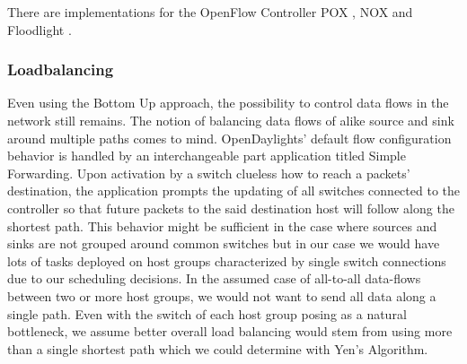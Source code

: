 There are implementations for the OpenFlow Controller POX \cite{opennetmon}, NOX \cite{opentm} and
Floodlight \cite {flowsense}.

\subsubsection{Loadbalancing}
Even using the Bottom Up approach, the possibility to control data flows in the network still
remains. The notion of balancing data flows of alike source and sink around multiple paths comes to
mind. OpenDaylights’ default flow configuration behavior is handled by an interchangeable part
application titled Simple Forwarding. Upon activation by a switch clueless how to reach a packets’
destination, the application prompts the updating of all switches connected to the controller so
that future packets to the said destination host will follow along the shortest path. This behavior
might be sufficient in the case where sources and sinks are not grouped around common switches but
in our case we would have lots of tasks deployed on host groups characterized by single switch
connections due to our scheduling decisions. In the assumed case of all-to-all data-flows between
two or more host groups, we would not want to send all data along a single path. Even with the
switch of each host group posing as a natural bottleneck, we assume better overall load balancing
would stem from using more than a single shortest path which we could determine with Yen’s
Algorithm.
